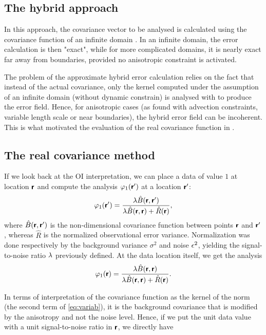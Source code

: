\subsection{The hybrid approach}

In this approach, the covariance vector to be analysed is calculated using the covariance function of an infinite domain \citep{BRANKART98,RIXEN00}. In an infinite domain, the error calculation is then "exact", while for more complicated domains, it is nearly exact far away from boundaries, provided no anisotropic constraint is activated. 

The problem of the approximate hybrid error calculation relies on the fact that instead of the actual covariance, only the kernel computed under the assumption of an infinite domain (without dynamic constrain) is analysed with \diva to produce the error field. Hence, for anisotropic cases (as found with advection constraints, variable length scale or near boundaries), the hybrid error field can be incoherent. This is what motivated the evaluation of the real covariance function in \diva.

\subsection{The real covariance method}

If we look back at the OI interpretation, we can place a data of value $1$ at location $\mbox{\boldmath $ \protect\mathsf{r} $}$ and compute the analysis $\varphi_1(\mbox{\boldmath $ \protect\mathsf{r} $}^\prime)$ at a location $\mbox{\boldmath $ \protect\mathsf{r} $}^\prime$:
\begin{equation}
\varphi_1(\mbox{\boldmath $ \protect\mathsf{r} $}^\prime) = {\lambda \hat{B} (\mbox{\boldmath $ \protect\mathsf{r} $},\mbox{\boldmath $ \protect\mathsf{r} $}^\prime)\over  \lambda \hat{B}(\mbox{\boldmath $ \protect\mathsf{r} $},\mbox{\boldmath $ \protect\mathsf{r} $}) + \hat{R}(\mbox{\boldmath $ \protect\mathsf{r} $}) },
\end{equation}
where $\hat{B}(\mbox{\boldmath $ \protect\mathsf{r} $},\mbox{\boldmath $ \protect\mathsf{r} $}^\prime)$ is the non-dimensional covariance function between points $\mbox{\boldmath $ \protect\mathsf{r} $}$ and $\mbox{\boldmath $ \protect\mathsf{r} $}^\prime$, whereas $\hat{R}$ is the normalized observational error variance. Normalization was done respectively by the background variance $\sigma^2$ and noise $\epsilon^2$, yielding the signal-to-noise ratio $\lambda$ previously defined. 
At the data location itself, we get the analysis
\begin{equation}
\varphi_1(\mbox{\boldmath $ \protect\mathsf{r} $}) = {\lambda \hat{B} (\mbox{\boldmath $ \protect\mathsf{r} $},\mbox{\boldmath $ \protect\mathsf{r} $}) \over \lambda \hat{B}(\mbox{\boldmath $ \protect\mathsf{r} $},\mbox{\boldmath $ \protect\mathsf{r} $}) + \hat{R}(\mbox{\boldmath $ \protect\mathsf{r} $}) }.
\end{equation}

In terms of interpretation of the covariance function as the kernel of the norm (the second term of \eqref{eq:variab}), it is the background covariance that is modified by the anisotropy and not the noise level. Hence, if we put the unit data value with a unit signal-to-noise ratio in $\mbox{\boldmath $ \protect\mathsf{r} $}$, we directly have


